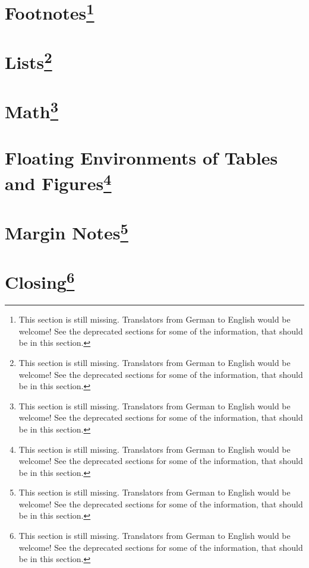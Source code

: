 \section{Footnotes\protect\footnote{This section is still missing. Translators
    from German to English would be welcome! See the deprecated sections for
    some of the information, that should be in this section.}}
\label{sec:scrlttr2.stillmissing}
\mbox{}

\section{Lists\protect\footnote{This section is still missing. Translators
    from German to English would be welcome! See the deprecated sections for
    some of the information, that should be in this section.}}
\label{sec:scrlttr2.stillmissing}
\mbox{}

\section{Math\protect\footnote{This section is still missing. Translators
    from German to English would be welcome! See the deprecated sections for
    some of the information, that should be in this section.}}
\label{sec:scrlttr2.stillmissing}
\mbox{}

\section{Floating Environments of Tables and Figures\protect\footnote{This section is still missing. Translators
    from German to English would be welcome! See the deprecated sections for
    some of the information, that should be in this section.}}
\label{sec:scrlttr2.stillmissing}
\mbox{}

\section{Margin Notes\protect\footnote{This section is still missing. Translators
    from German to English would be welcome! See the deprecated sections for
    some of the information, that should be in this section.}}
\label{sec:scrlttr2.stillmissing}
\mbox{}

\section{Closing\protect\footnote{This section is still missing. Translators
    from German to English would be welcome! See the deprecated sections for
    some of the information, that should be in this section.}}
\label{sec:scrlttr2.stillmissing}
\mbox{}

